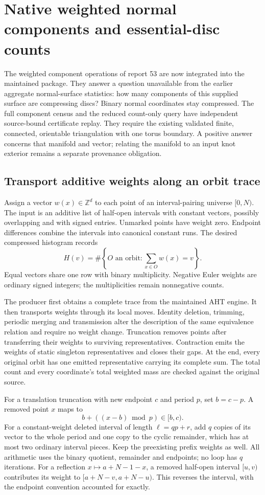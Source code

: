 \section{Native weighted normal components and essential-disc counts}
\label{sec:weighted-components}

The weighted component operations of report 53 are now integrated into the
maintained package. They answer a question unavailable from the earlier
aggregate normal-surface statistics: how many components of this supplied
surface are compressing discs? Binary normal coordinates stay compressed.
The full component census and the reduced count-only query have independent
source-bound certificate replay. They require the existing validated finite,
connected, orientable triangulation with one torus boundary. A positive answer
concerns that manifold and vector; relating the manifold to an input knot
exterior remains a separate provenance obligation.

\subsection{Transport additive weights along an orbit trace}

Assign a vector $w(x)\in\mathbb Z^d$ to each point of an interval-pairing
universe $[0,N)$. The input is an additive list of half-open intervals with
constant vectors, possibly overlapping and with signed entries. Unmarked
points have weight zero. Endpoint differences combine the intervals into
canonical constant runs. The desired compressed histogram records
\[
 H(v)=\#\left\{O\text{ an orbit}:\sum_{x\in O}w(x)=v\right\}.
\]
Equal vectors share one row with binary multiplicity. Negative Euler weights
are ordinary signed integers; the multiplicities remain nonnegative counts.

The producer first obtains a complete trace from the maintained AHT engine.
It then transports weights through its local moves. Identity deletion,
trimming, periodic merging and transmission alter the description of the
same equivalence relation and require no weight change. Truncation removes
points after transferring their weights to surviving representatives.
Contraction emits the weights of static singleton representatives and closes
their gaps. At the end, every original orbit has one emitted representative
carrying its complete sum. The total count and every coordinate's total
weighted mass are checked against the original source.

For a translation truncation with new endpoint $c$ and period $p$, set
$b=c-p$. A removed point $x$ maps to
\[
 b+((x-b)\bmod p)\in[b,c).
\]
For a constant-weight deleted interval of length $\ell=qp+r$, add $q$
copies of its vector to the whole period and one copy to the cyclic remainder,
which has at most two ordinary interval pieces. Keep the preexisting prefix
weights as well. All arithmetic uses the binary quotient, remainder and
endpoints; no loop has $q$ iterations. For a reflection $x\mapsto a+N-1-x$,
a removed half-open interval $[u,v)$ contributes its weight to
$[a+N-v,a+N-u)$. This reverses the interval, with the endpoint convention
accounted for exactly.

